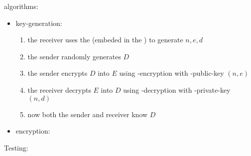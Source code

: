 algorithms:
\begin{itemize}
\item key-generation:
  \begin{enumerate}
  \item the receiver uses the \rsa{} \cs{}
    (embeded in the \dummy{} \cs) to generate $n, e, d$
  \item the sender randomly generates $D$
  \item the sender encrypts $D$ into $E$
    using \rsa-encryption with \rsa-public-key $(n, e)$
  \item the receiver decrypts $E$ into $D$
    using \rsa-decryption with \rsa-private-key $(n, d)$
  \item now both the sender and receiver know $D$
  \end{enumerate}
\item encryption:
\end{itemize}

Testing:
\codes{}


\subsubsection{\cry{} \cf}

\codes{}
